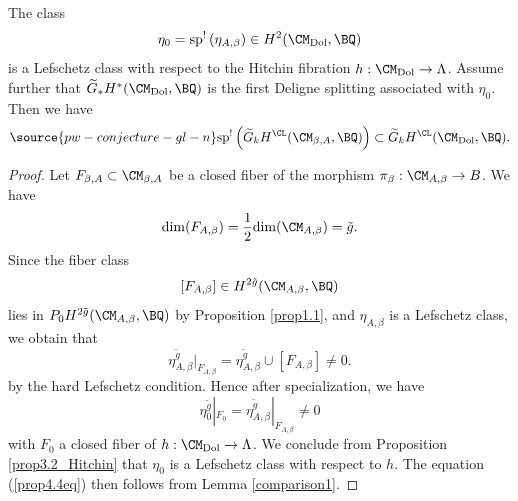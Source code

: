 \begin{prop}
\notready\label{prop4.4}
The class
\[
\eta_0 = \mathrm{sp}^!\left( \eta_{A,\beta}\right) \in H^2(\CM_{\mathrm{Dol}}, \BQ)
\]
is a Lefschetz class with respect to the Hitchin fibration $h: \CM_{\mathrm{Dol}} \to \Lambda$. Assume further that $\widetilde{G}_\ast H^*(\CM_{\mathrm{Dol}}, \BQ)$ is the first Deligne splitting associated with $\eta_0$. Then we have
\begin{equation}\label{prop4.4eq}
\source{pw-conjecture-gl-n}
\mathrm{sp}^!\left( \widetilde{G}_kH^\CL(\CM_{\beta,A}, \BQ) \right) \subset \widetilde{G}_k H^\CL(\CM_{\mathrm{Dol}}, \BQ).
\end{equation}
\end{prop}


\begin{proof}
Let $F_{\beta,A} \subset \CM_{\beta,A}$ be a closed fiber of the morphism $\pi_\beta: \CM_{A,\beta} \to B$. We have
\[
 \mathrm{dim}(F_{A,\beta})= \frac{1}{2}\mathrm{dim}(\CM_{A,\beta}) = \tilde{g}.
\]
Since the fiber class
\[
[F_{A,\beta}] \in H^{2\tilde{g}}(\CM_{A,\beta}, \BQ)
\]
lies in $P_0H^{2\tilde{g}}(\CM_{A,\beta}, \BQ)$ by Proposition \ref{prop1.1}, and $\eta_{A,\beta}$ is a Lefschetz class, we obtain that
\[
\eta_{A,\beta}^{\tilde{g}}|_{F_{A,\beta}} = \eta_{A,\beta}^{\tilde{g}} \cup [F_{A,\beta}] \neq 0.
\]
by the hard Lefschetz condition. Hence after specialization, we have
\[
\eta_0^{\tilde{g}}|_{F_0} = \eta_{A,\beta}^{\tilde{g}}|_{F_{A,\beta}} \neq 0
\]
with $F_0$ a closed fiber of $h: \CM_{\mathrm{Dol}} \to \Lambda$. We conclude from Proposition \ref{prop3.2_Hitchin} that $\eta_0$ is a Lefschetz class with respect to $h$. The equation (\ref{prop4.4eq}) then follows from Lemma \ref{comparison1}.
\end{proof}


